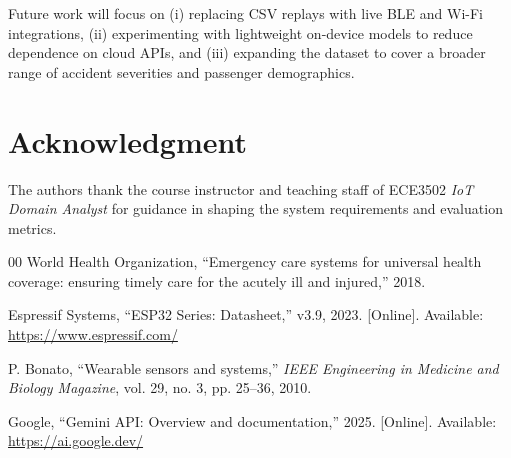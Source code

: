 \documentclass[conference]{IEEEtran}
\begin{document}
Future work will focus on (i) replacing CSV replays with live BLE and Wi-Fi integrations, (ii) experimenting with lightweight on-device models to reduce dependence on cloud APIs, and (iii) expanding the dataset to cover a broader range of accident severities and passenger demographics.

\section*{Acknowledgment}

The authors thank the course instructor and teaching staff of ECE3502 \textit{IoT Domain Analyst} for guidance in shaping the system requirements and evaluation metrics.

\begin{thebibliography}{00}
World Health Organization, ``Emergency care systems for universal health coverage: ensuring timely care for the acutely ill and injured,'' 2018.

Espressif Systems, ``ESP32 Series: Datasheet,'' v3.9, 2023. [Online]. Available: \url{https://www.espressif.com/}

P. Bonato, ``Wearable sensors and systems,'' \textit{IEEE Engineering in Medicine and Biology Magazine}, vol. 29, no. 3, pp. 25--36, 2010.

Google, ``Gemini API: Overview and documentation,'' 2025. [Online]. Available: \url{https://ai.google.dev/}
\end{thebibliography}
\end{document}
